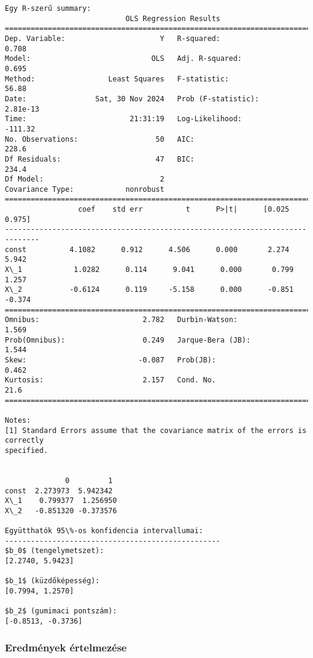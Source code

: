 \documentclass[11pt]{article}
\begin{document}
    \begin{Verbatim}[commandchars=\\\{\}]
Egy R-szerű summary:
                            OLS Regression Results
==============================================================================
Dep. Variable:                      Y   R-squared:                       0.708
Model:                            OLS   Adj. R-squared:                  0.695
Method:                 Least Squares   F-statistic:                     56.88
Date:                Sat, 30 Nov 2024   Prob (F-statistic):           2.81e-13
Time:                        21:31:19   Log-Likelihood:                -111.32
No. Observations:                  50   AIC:                             228.6
Df Residuals:                      47   BIC:                             234.4
Df Model:                           2
Covariance Type:            nonrobust
==============================================================================
                 coef    std err          t      P>|t|      [0.025      0.975]
------------------------------------------------------------------------------
const          4.1082      0.912      4.506      0.000       2.274       5.942
X\_1            1.0282      0.114      9.041      0.000       0.799       1.257
X\_2           -0.6124      0.119     -5.158      0.000      -0.851      -0.374
==============================================================================
Omnibus:                        2.782   Durbin-Watson:                   1.569
Prob(Omnibus):                  0.249   Jarque-Bera (JB):                1.544
Skew:                          -0.087   Prob(JB):                        0.462
Kurtosis:                       2.157   Cond. No.                         21.6
==============================================================================

Notes:
[1] Standard Errors assume that the covariance matrix of the errors is correctly
specified.


              0         1
const  2.273973  5.942342
X\_1    0.799377  1.256950
X\_2   -0.851320 -0.373576

Együtthatók 95\%-os konfidencia intervallumai:
--------------------------------------------------
$b_0$ (tengelymetszet):
[2.2740, 5.9423]

$b_1$ (küzdőképesség):
[0.7994, 1.2570]

$b_2$ (gumimaci pontszám):
[-0.8513, -0.3736]
    \end{Verbatim}

    \subsubsection{Eredmények
értelmezése}\label{eredmuxe9nyek-uxe9rtelmezuxe9se}
\end{document}
